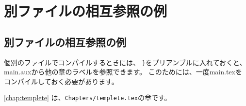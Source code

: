 \documentclass[../main/main.tex]{subfiles}
\begin{document}
\chapter{別ファイルの相互参照の例} 
\section{別ファイルの相互参照の例} 

個別のファイルでコンパイルするときには、
\verb|}|をプリアンブルに入れておくと、
main.auxから他の章のラベルを参照できます。
このためには、一度main.texをコンパイルしておく必要があります。

\cref{chap:templete} は、\verb|Chapters/templete.tex|の章です。
    
\end{document}
